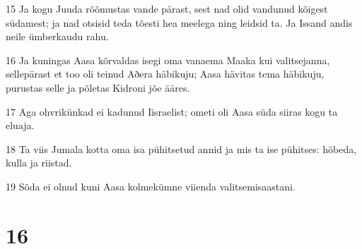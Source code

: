 \par 15 Ja kogu Juuda rõõmustas vande pärast, sest nad olid vandunud kõigest südamest; ja nad otsisid teda tõesti hea meelega ning leidsid ta. Ja Issand andis neile ümberkaudu rahu.
\par 16 Ja kuningas Aasa kõrvaldas isegi oma vanaema Maaka kui valitsejanna, sellepärast et too oli teinud Aðera häbikuju; Aasa hävitas tema häbikuju, purustas selle ja põletas Kidroni jõe ääres.
\par 17 Aga ohvrikünkad ei kadunud Iisraelist; ometi oli Aasa süda siiras kogu ta eluaja.
\par 18 Ta viis Jumala kotta oma isa pühitsetud annid ja mis ta ise pühitses: hõbeda, kulla ja riistad.
\par 19 Sõda ei olnud kuni Aasa kolmekümne viienda valitsemisaastani.

\chapter{16}

